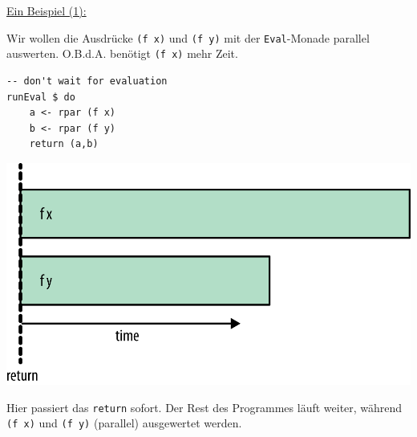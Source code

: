 \documentclass{beamer}
\begin{document}

\begin{frame}[fragile]
\underline{Ein Beispiel (1):}\smallskip

Wir wollen die Ausdrücke \texttt{(f x)} und \texttt{(f y)} mit der \texttt{Eval}-Monade parallel auswerten. O.B.d.A. benötigt \texttt{(f x)} mehr Zeit.\pause

\begin{multicols}{2}
\begin{verbatim}
-- don't wait for evaluation
runEval $ do
    a <- rpar (f x)
    b <- rpar (f y)
    return (a,b)
\end{verbatim}
\columnbreak
\pause
\includegraphics[scale=0.7]{evalmonad_01.png}
\end{multicols}
\pause

Hier passiert das \texttt{return} sofort. Der Rest des Programmes läuft weiter, während \texttt{(f x)} und \texttt{(f y)} (parallel) ausgewertet werden.
\end{frame}

\end{document}
